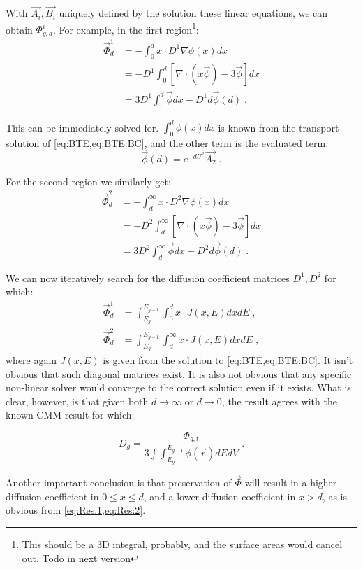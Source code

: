 \documentclass[a4paper,letterpaper,12pt,oneside,draft]{article}
\newcommand{\eec}{\;,}
\newcommand{\eep}{\;.}
\newcommand{\intg}[2][g]{\ensuremath{\int_{E_{#1}}^{E_{#1-1}} #2 dE}}
\newcommand{\vr}{\ensuremath{\vec{r}}}
\begin{document}
    With $\vec{A_i},\vec{B_i}$ uniquely defined by the solution these linear equations, we can obtain $\Phi_{g,d}^i$. For example, in the first region\footnote{This should be a 3D integral, probably, and the surface areas would cancel out. Todo in next version}:
    \begin{align}
    \label{eq:Res:1}
        \vec{\Phi}_{d}^1 &= -\int_{0}^{d}x\cdot D^1\nabla \phi(x)dx \\\nonumber
        &= -D^1\int_{0}^{d}\left[\nabla\cdot (x\vec{\phi}) - 3\vec{\phi}\right]dx \\\nonumber
        &= 3D^1\int_{0}^{d}\vec{\phi}dx - D^1d\vec{\phi}(d) \eep
    \end{align}
    
    This can be immediately solved for. $\int_0^d\phi(x)dx$ is known from the transport solution of \cref{eq:BTE,eq:BTE:BC}, and the other term is the evaluated term:
    \begin{equation}
    \label{eq:interface:intro}
        \vec{\phi}(d) = e^{-dU^2}\vec{A_2}\eep
    \end{equation}
    
    For the second region we similarly get:
    \begin{align}
     \label{eq:Res:2}
         \vec{\Phi}_{d}^2 &= -\int_{d}^{\infty}x\cdot D^2\nabla \phi(x)dx \\\nonumber
         &= -D^2\int_{d}^{\infty}\left[\nabla\cdot (x\vec{\phi}) - 3\vec{\phi}\right]dx \\\nonumber
         &= 3D^2\int_{d}^{\infty}\vec{\phi}dx + D^2d\vec{\phi}(d) \eep
    \end{align}
    
    We can now iteratively search for the diffusion coefficient matrices $D^1,D^2$ for which: 
    \begin{align*}
    \vec{\Phi}_d^1 &= \intg{\int_0^d x\cdot J(x,E)dx} \eec \\
    \vec{\Phi}_d^2 &= \intg{\int_d^\infty x\cdot J(x,E)dx} \eec
    \end{align*}
    where again $J(x,E)$ is given from the solution to \cref{eq:BTE,eq:BTE:BC}.
    It isn't obvious that such diagonal matrices exist. It is also not obvious that any specific non-linear solver would converge to the correct solution even if it exists. What is clear, however, is that given both $d\to\infty$ or $d\to 0$, the result agrees with the known CMM result for which:
    
    \begin{equation}
    D_g = \frac{\Phi_{g,t}}{3\int\intg{\phi(\vr)}dV}\eep
    \end{equation}
    
    Another important conclusion is that preservation of $\vec{\Phi}$ will result in a higher diffusion coefficient in $0\leq x\leq d$, and a lower diffusion coefficient in $x>d$, as is obvious from \cref{eq:Res:1,eq:Res:2}.
    
\end{document}
